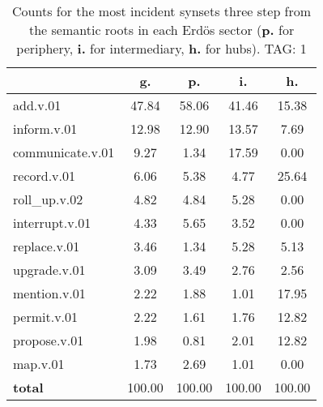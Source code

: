 \begin{table}[h!]
\begin{center}
\begin{tabular}{| l | c | c | c | c |}\hline
 & g. & p. & i. & h. \\\hline
add.v.01 & 47.84  & 58.06  & 41.46  & 15.38 \\\hline
inform.v.01 & 12.98  & 12.90  & 13.57  & 7.69 \\\hline
communicate.v.01 & 9.27  & 1.34  & 17.59  & 0.00 \\\hline
record.v.01 & 6.06  & 5.38  & 4.77  & 25.64 \\\hline
roll\_up.v.02 & 4.82  & 4.84  & 5.28  & 0.00 \\\hline
interrupt.v.01 & 4.33  & 5.65  & 3.52  & 0.00 \\\hline
replace.v.01 & 3.46  & 1.34  & 5.28  & 5.13 \\\hline
upgrade.v.01 & 3.09  & 3.49  & 2.76  & 2.56 \\\hline
mention.v.01 & 2.22  & 1.88  & 1.01  & 17.95 \\\hline
permit.v.01 & 2.22  & 1.61  & 1.76  & 12.82 \\\hline
propose.v.01 & 1.98  & 0.81  & 2.01  & 12.82 \\\hline
map.v.01 & 1.73  & 2.69  & 1.01  & 0.00 \\\hline
{{\bf total}} & 100.00  & 100.00  & 100.00  & 100.00 \\\hline
\end{tabular}
\caption{Counts for the most incident synsets three step from the semantic roots in each Erd\"os sector ({\bf p.} for periphery, {\bf i.} for intermediary, {\bf h.} for hubs). TAG: 1}
\end{center}
\end{table}
